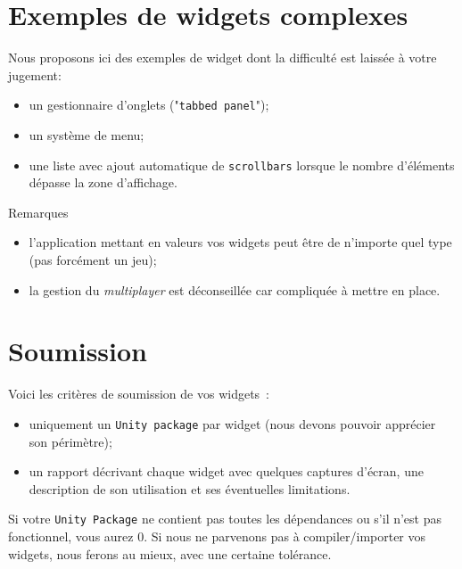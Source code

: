 \documentclass[a4paper,10pt]{article}
\begin{document}
\section{Exemples de widgets complexes}

Nous proposons ici des exemples de widget dont la difficulté est laissée à votre jugement:
\begin{itemize}
	\item un gestionnaire d'onglets ("\texttt{tabbed panel}");
	\item un système de menu;
	\item une liste avec ajout automatique de \texttt{scrollbars} lorsque le nombre d'éléments dépasse la zone d'affichage.
\end{itemize}

Remarques
\begin{itemize}
	\item  l'application mettant en valeurs vos widgets peut être de n'importe quel type (pas forcément un jeu);
	\item la gestion du \textit{multiplayer} est déconseillée car compliquée à mettre en place.
\end{itemize}

\section{Soumission}

Voici les critères de soumission de vos widgets~:
\begin{itemize}
	\item  uniquement un \texttt{Unity package} par widget (nous devons pouvoir apprécier son périmètre);
	\item un rapport décrivant chaque widget avec quelques captures d'écran, une description de son utilisation et ses éventuelles limitations.
\end{itemize}

Si votre \texttt{Unity Package} ne contient pas toutes les dépendances ou s'il n'est pas fonctionnel, vous aurez 0. Si nous ne parvenons pas à compiler/importer vos widgets, nous ferons au mieux, avec une certaine tolérance.
\end{document}
